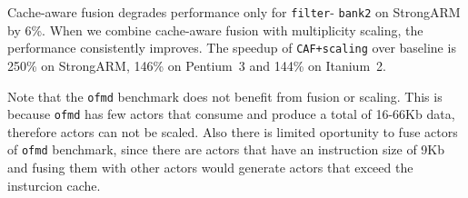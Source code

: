 





Cache-aware fusion degrades performance only for \texttt{filter}-
\texttt{bank2} on StrongARM by 6\%. When we combine cache-aware fusion 
with multiplicity scaling, the performance consistently improves. 
The speedup of \texttt{CAF+scaling} over baseline is 250\% on StrongARM,
146\% on Pentium~3 and 144\% on Itanium~2.




Note that the \texttt{ofmd} benchmark does not benefit from fusion or
scaling. This is because  \texttt{ofmd} has few actors that consume 
and produce a total of 16-66Kb data, therefore actors can not be scaled.
Also there is limited oportunity to fuse actors of \texttt{ofmd} 
benchmark, since there are actors that have an instruction size of 9Kb 
and fusing them with other actors would generate actors that exceed the
insturcion cache.


